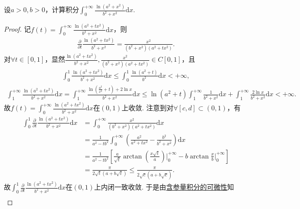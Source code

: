 \documentclass[../../main.tex]{subfiles}%
\begin{document}
\begin{example}
设$a>0,b>0$，计算积分$\int_0^{+\infty}\frac{\ln(a^2+x^2)}{b^2+x^2}\mathrm{d}x.$
\end{example}
\begin{proof}

记$f(t)=\int_0^{+\infty}\frac{\ln \left( a^2+tx^2 \right)}{b^2+x^2}\mathrm{d}x$，则
\begin{align*}
\frac{\partial}{\partial t}\frac{\ln \left( a^2+tx^2 \right)}{b^2+x^2}=\frac{x^2}{\left( b^2+x^2 \right) \left( a^2+tx^2 \right)}.
\end{align*}
对$\forall t\in \left[ 0,1 \right]$，显然$\frac{\ln \left( a^2+tx^2 \right)}{b^2+x^2},\frac{x^2}{\left( b^2+x^2 \right) \left( a^2+tx^2 \right)}\in C\left[ 0,1 \right]$，且
\begin{align*}
\int_0^1\frac{\ln \left( a^2+tx^2 \right)}{b^2+x^2}\mathrm{d}x\leqslant \int_0^1\frac{\ln \left( a^2+t \right)}{b^2}\mathrm{d}x<+\infty,
\end{align*}
\begin{align*}
\int_1^{+\infty}\frac{\ln \left( a^2+tx^2 \right)}{b^2+x^2}\mathrm{d}x=\int_1^{+\infty}\frac{\ln \left( \frac{a^2}{x^2}+t \right) +2\ln x}{b^2+x^2}\mathrm{d}x
\leqslant \ln \left( a^2+t \right) \int_1^{+\infty}\frac{1}{b^2+x^2}\mathrm{d}x+\int_1^{+\infty}\frac{2\ln x}{b^2+x^2}\mathrm{d}x<+\infty.
\end{align*}
故$f(t)=\int_0^{+\infty}\frac{\ln \left( a^2+tx^2 \right)}{b^2+x^2}\mathrm{d}x$在$\left( 0,1 \right)$上收敛. 注意到对$\forall \left[ c,d \right] \subset \left( 0,1 \right)$，有
\begin{align*}
\int_0^1\frac{\partial}{\partial t}\frac{\ln \left( a^2+tx^2 \right)}{b^2+x^2}\mathrm{d}x&=\int_0^{+\infty}\frac{x^2}{\left( b^2+x^2 \right) \left( a^2+tx^2 \right)}\mathrm{d}x\\
&=\frac{1}{a^2-tb^2}\int_0^{+\infty}\left( \frac{a^2}{a^2+tx^2}-\frac{b^2}{b^2+x^2} \right) \mathrm{d}x\\
&=\frac{1}{a^2-tb^2}\left[ \frac{a}{\sqrt{t}}\arctan \left( \frac{x\sqrt{t}}{a} \right) \bigg|_{0}^{+\infty}-b\arctan \frac{x}{b}\bigg|_{0}^{+\infty} \right] \\
&=\frac{\pi}{2\sqrt{t}\left( a+b\sqrt{t} \right)}\leqslant \frac{\pi}{2\sqrt{c}\left( a+b\sqrt{c} \right)}.
\end{align*}
故$\int_0^1\frac{\partial}{\partial t}\frac{\ln \left( a^2+tx^2 \right)}{b^2+x^2}\mathrm{d}x$在$\left( 0,1 \right)$上内闭一致收敛. 于是由\hyperref[theorem:含参反常积分的可微性]{含参量积分的可微性}知
\begin{align*}

\end{align*}
\end{proof}
\end{document}
